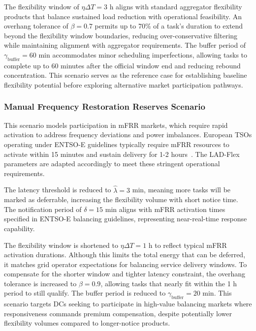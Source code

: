 \documentclass[preprint,12pt]{elsarticle}
\begin{document}
The flexibility window of $\eta\Delta T = 3$ h aligns with standard aggregator flexibility products that balance sustained load reduction with operational feasibility. An overhang tolerance of $\beta = 0.7$ permits up to 70\% of a task's duration to extend beyond the flexibility window boundaries, reducing over-conservative filtering while maintaining alignment with aggregator requirements. The buffer period of $\gamma_{\text{buffer}} = 60$ min accommodates minor scheduling imperfections, allowing tasks to complete up to 60 minutes after the official window end and reducing rebound concentration. This scenario serves as the reference case for establishing baseline flexibility potential before exploring alternative market participation pathways.

\subsubsection{Manual Frequency Restoration Reserves Scenario}

This scenario models participation in mFRR markets, which require rapid activation to address frequency deviations and power imbalances. European TSOs operating under ENTSO-E guidelines typically require mFRR resources to activate within 15 minutes and sustain delivery for 1-2 hours~\cite{ENTSOE_MARI_IG_v1_7}. The LAD-Flex parameters are adapted accordingly to meet these stringent operational requirements.

The latency threshold is reduced to $\hat{\lambda} = 3$ min, meaning more tasks will be marked as deferrable, increasing the flexibility volume with short notice time. The notification period of $\delta = 15$ min aligns with mFRR activation times specified in ENTSO-E balancing guidelines, representing near-real-time response capability.

The flexibility window is shortened to $\eta\Delta T = 1$ h to reflect typical mFRR activation durations. Although this limits the total energy that can be deferred, it matches grid operator expectations for balancing service delivery windows. To compensate for the shorter window and tighter latency constraint, the overhang tolerance is increased to $\beta = 0.9$, allowing tasks that nearly fit within the 1 h period to still qualify. The buffer period is reduced to $\gamma_{\text{buffer}} = 20$ min. This scenario targets DCs seeking to participate in high-value balancing markets where responsiveness commands premium compensation, despite potentially lower flexibility volumes compared to longer-notice products.
\end{document}
